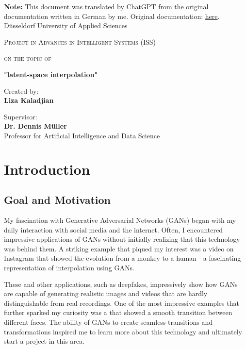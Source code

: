 \documentclass[a4paper, 12pt]{article}
\title{\haThema}
\author{\haAutor}
\date{\today}
\newcommand{\haThema}{"latent-space interpolation"}
\newcommand{\haAutor}{Liza Kaladjian}
\newcommand{\haDeckblattTextEins}{Project in Advances in Intelligent Systems (ISS)}
\newcommand{\haGutachter}{Dr. Dennis Müller}
\newcommand{\haGutachterText}{Professor for Artificial Intelligence and Data Science}
\begin{document}
\begin{titlepage}
\noindent
\textbf{Note:} This document was translated by ChatGPT from the original documentation written in German by me.  Original documentation: \href{https://github.com/Lizoug/FaceFusion-Videos-from-Latent-Interpolations/blob/main/German_Documentation/Dokumentation.pdf}{here}.\\
Düsseldorf University of Applied Sciences \\
\begin{center}
\vspace{1.5cm}
{\scshape\large \haDeckblattTextEins \par}
\vspace{1cm}
{\scshape\large on the topic of\par}
\vspace{1.5cm}
{\LARGE\bfseries \haThema \par}
\vfill
{Created by:\\ {\bfseries \haAutor} \par}
\vspace{1cm}
\vspace{1cm}
Supervisor:\\ {\bfseries \haGutachter}\\ \haGutachterText
\vfill
\end{center}
\end{titlepage}
\thispagestyle{empty}
\newpage

\tableofcontents
\thispagestyle{empty}
\newpage

\setcounter{page}{1}

\section{Introduction}
\subsection{Goal and Motivation}
My fascination with Generative Adversarial Networks (GANs) began with my daily interaction with social media and the internet. Often, I encountered impressive applications of GANs without initially realizing that this technology was behind them. A striking example that piqued my interest was a video on Instagram that showed the evolution from a monkey to a human - a fascinating representation of interpolation using GANs.

These and other applications, such as deepfakes, impressively show how GANs are capable of generating realistic images and videos that are hardly distinguishable from real recordings. One of the most impressive examples that further sparked my curiosity was a \cite{gif_example} that showed a smooth transition between different faces. The ability of GANs to create seamless transitions and transformations inspired me to learn more about this technology and ultimately start a project in this area.
\end{document}
